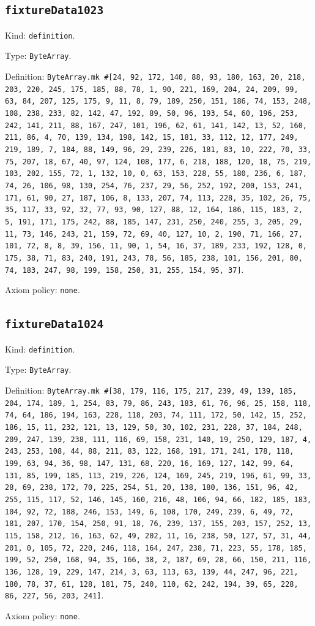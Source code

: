 \documentclass[11pt]{article}
\begin{document}
\subsection*{\texttt{fixtureData1023}}
\noindent Kind: \texttt{definition}.\par
\noindent Type: \texttt{ByteArray}.\par
\noindent Definition: \texttt{ByteArray.mk \#[24, 92, 172, 140, 88, 93, 180, 163, 20, 218, 203, 220, 245, 175, 185, 88, 78, 1, 90, 221, 169, 204, 24, 209, 99, 63, 84, 207, 125, 175, 9, 11, 8, 79, 189, 250, 151, 186, 74, 153, 248, 108, 238, 233, 82, 142, 47, 192, 89, 50, 96, 193, 54, 60, 196, 253, 242, 141, 211, 88, 167, 247, 101, 196, 62, 61, 141, 142, 13, 52, 160, 211, 86, 4, 70, 139, 134, 198, 142, 15, 181, 33, 112, 12, 177, 249, 219, 189, 7, 184, 88, 149, 96, 29, 239, 226, 181, 83, 10, 222, 70, 33, 75, 207, 18, 67, 40, 97, 124, 108, 177, 6, 218, 188, 120, 18, 75, 219, 103, 202, 155, 72, 1, 132, 10, 0, 63, 153, 228, 55, 180, 236, 6, 187, 74, 26, 106, 98, 130, 254, 76, 237, 29, 56, 252, 192, 200, 153, 241, 171, 61, 90, 27, 187, 106, 8, 133, 207, 74, 113, 228, 35, 102, 26, 75, 35, 117, 33, 92, 32, 77, 93, 90, 127, 88, 12, 164, 186, 115, 183, 2, 5, 191, 171, 175, 242, 88, 185, 147, 231, 250, 240, 255, 3, 205, 29, 11, 73, 146, 243, 21, 159, 72, 69, 40, 127, 10, 2, 190, 71, 166, 27, 101, 72, 8, 8, 39, 156, 11, 90, 1, 54, 16, 37, 189, 233, 192, 128, 0, 175, 38, 71, 83, 240, 191, 243, 78, 56, 185, 238, 101, 156, 201, 80, 74, 183, 247, 98, 199, 158, 250, 31, 255, 154, 95, 37]}.\par
\noindent Axiom policy: \texttt{none}.\par
\subsection*{\texttt{fixtureData1024}}
\noindent Kind: \texttt{definition}.\par
\noindent Type: \texttt{ByteArray}.\par
\noindent Definition: \texttt{ByteArray.mk \#[38, 179, 116, 175, 217, 239, 49, 139, 185, 204, 174, 189, 1, 254, 83, 79, 86, 243, 183, 61, 76, 96, 25, 158, 118, 74, 64, 186, 194, 163, 228, 118, 203, 74, 111, 172, 50, 142, 15, 252, 186, 15, 11, 232, 121, 13, 129, 50, 30, 102, 231, 228, 37, 184, 248, 209, 247, 139, 238, 111, 116, 69, 158, 231, 140, 19, 250, 129, 187, 4, 243, 253, 108, 44, 88, 211, 83, 122, 168, 191, 171, 241, 178, 118, 199, 63, 94, 36, 98, 147, 131, 68, 220, 16, 169, 127, 142, 99, 64, 131, 85, 199, 185, 113, 219, 226, 124, 169, 245, 219, 196, 61, 99, 33, 28, 69, 238, 172, 70, 225, 254, 51, 20, 138, 180, 136, 151, 96, 42, 255, 115, 117, 52, 146, 145, 160, 216, 48, 106, 94, 66, 182, 185, 183, 104, 92, 72, 188, 246, 153, 149, 6, 108, 170, 249, 239, 6, 49, 72, 181, 207, 170, 154, 250, 91, 18, 76, 239, 137, 155, 203, 157, 252, 13, 115, 158, 212, 16, 163, 62, 49, 202, 11, 16, 238, 50, 127, 57, 31, 44, 201, 0, 105, 72, 220, 246, 118, 164, 247, 238, 71, 223, 55, 178, 185, 199, 52, 250, 168, 94, 35, 166, 38, 2, 187, 69, 28, 66, 150, 211, 116, 136, 128, 19, 229, 147, 214, 3, 63, 113, 63, 139, 44, 247, 96, 221, 180, 78, 37, 61, 128, 181, 75, 240, 110, 62, 242, 194, 39, 65, 228, 86, 227, 56, 203, 241]}.\par
\noindent Axiom policy: \texttt{none}.\par
\end{document}

